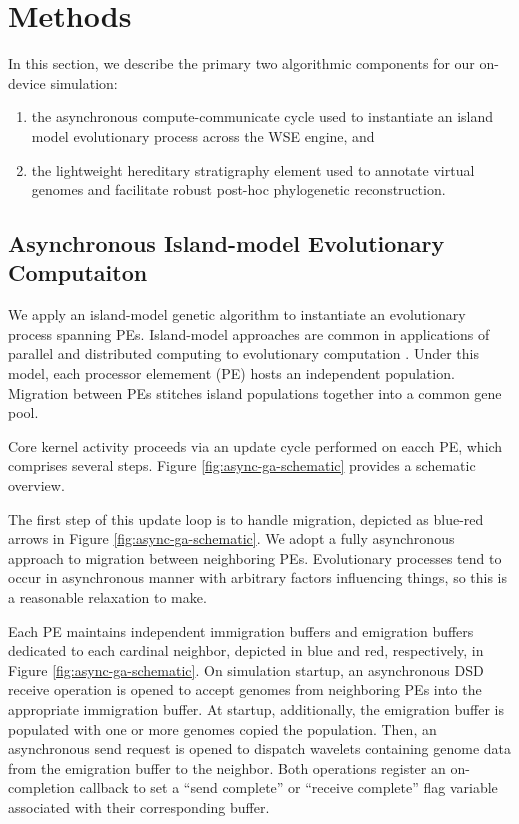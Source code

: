 \section{Methods} \label{sec:methods}

In this section, we describe the primary two algorithmic components for our on-device simulation:
\begin{enumerate}
\item the asynchronous compute-communicate cycle used to instantiate an island model evolutionary process across the WSE engine, and
\item the lightweight hereditary stratigraphy element used to annotate virtual genomes and facilitate robust post-hoc phylogenetic reconstruction.
\end{enumerate}

\subsection{Asynchronous Island-model Evolutionary Computaiton}

We apply an island-model genetic algorithm to instantiate an evolutionary process spanning PEs.
Island-model approaches are common in applications of parallel and distributed computing to evolutionary computation \citep{kozaTODO}.
Under this model, each processor elemement (PE) hosts an independent population.
Migration between PEs stitches island populations together into a common gene pool.



Core kernel activity proceeds via an update cycle performed on eacch PE, which comprises several steps.
Figure \ref{fig:async-ga-schematic} provides a schematic overview.

The first step of this update loop is to handle migration, depicted as blue-red arrows in Figure \ref{fig:async-ga-schematic}.
We adopt a fully asynchronous approach to migration between neighboring PEs.
Evolutionary processes tend to occur in asynchronous manner with arbitrary factors influencing things, so this is a reasonable relaxation to make.

Each PE maintains independent immigration buffers and emigration buffers dedicated to each cardinal neighbor, depicted in blue and red, respectively, in Figure \ref{fig:async-ga-schematic}.
On simulation startup, an asynchronous DSD receive operation is opened to accept genomes from neighboring PEs into the appropriate immigration buffer.
At startup, additionally, the emigration buffer is populated with one or more genomes copied the population.
Then, an asynchronous send request is opened to dispatch wavelets containing genome data from the emigration buffer to the neighbor.
Both operations register an on-completion callback to set a ``send complete'' or ``receive complete'' flag variable associated with their corresponding buffer.

